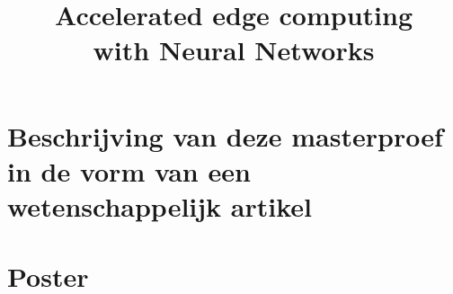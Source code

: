 \documentclass[11pt,a4paper,twoside,openright]{report}
\title{Accelerated edge computing\\ with Neural Networks}
\begin{document}

\preface












\appendix


\chapter{Beschrijving van deze masterproef in de vorm van een wetenschappelijk artikel}
%

\chapter{Poster}
%


\end{document}
